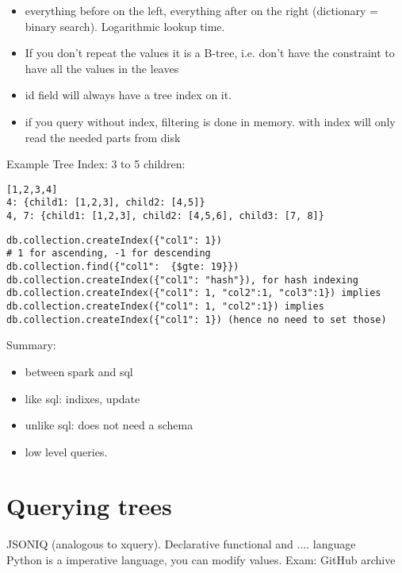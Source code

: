 \begin{itemize}
\begin{itemize}
\begin{itemize}
            \item everything before on the left, everything after on the right (dictionary = binary search).
            Logarithmic lookup time.
            \item If you don't repeat the values it is a B-tree, i.e. don't have the constraint to have all the values in the leaves
            \item id field will always have a tree index on it.
            \item if you query without index, filtering is done in memory. with index will only read
            the needed parts from disk
        \end{itemize}
    \end{itemize}
\end{itemize}

Example Tree Index: 3 to 5 children:
\begin{lstlisting}
[1,2,3,4]
4: {child1: [1,2,3], child2: [4,5]}
4, 7: {child1: [1,2,3], child2: [4,5,6], child3: [7, 8]}
\end{lstlisting}


\begin{lstlisting}
db.collection.createIndex({"col1": 1})
# 1 for ascending, -1 for descending
db.collection.find({"col1":  {$gte: 19}})
db.collection.createIndex({"col1": "hash"}), for hash indexing
db.collection.createIndex({"col1": 1, "col2":1, "col3":1}) implies
db.collection.createIndex({"col1": 1, "col2":1}) implies
db.collection.createIndex({"col1": 1}) (hence no need to set those)
\end{lstlisting}


Summary:
\begin{itemize}
    \item between spark and sql
    \item like sql: indixes, update
    \item unlike sql: does not need a schema
    \item low level queries.
\end{itemize}

\section{Querying trees}
JSONIQ (analogous to xquery). Declarative functional and .... language\\
Python is a imperative language, you can modify values.
Exam: GitHub archive

